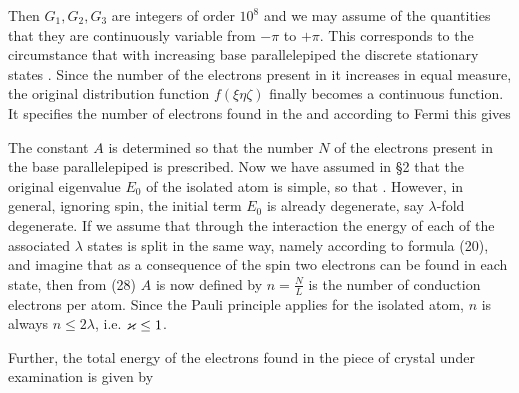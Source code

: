 \begin{paper}{1}
Then $G_1,G_2,G_3$ are integers of order $10^8$ and we may assume of the quantities
that they are continuously variable from $-\pi$ to $+\pi$. This corresponds to the circumstance that with increasing base parallelepiped the discrete stationary states . Since the number of the electrons present in it increases in equal measure, the original  distribution function $f(\xi\eta\zeta)$ finally becomes a continuous function. It specifies the number of electrons found in the 
and according to Fermi this gives

The constant $A$ is determined so that the number $N$ of the electrons present in the base parallelepiped is prescribed. Now we have assumed in \S2 that the original eigenvalue $E_0$ of the isolated atom is simple, so that . However, in general, ignoring spin, the initial term $E_0$ is already degenerate, say $\lambda$-fold degenerate. If we assume that through the interaction the energy of each of the associated $\lambda$ states is split in the same way, namely according to formula (20), and imagine that as a consequence of the spin two electrons can be found in each state, then from (28)
$A$ is now defined by
$n=\frac{N}{L}$ is the number of conduction electrons per atom. Since the Pauli principle applies for the isolated atom, $n$ is always $n\leq 2\lambda$, i.e. $\varkappa \leq 1$.

Further, the total energy of the electrons found in the piece of crystal under examination is given by


\end{paper}
